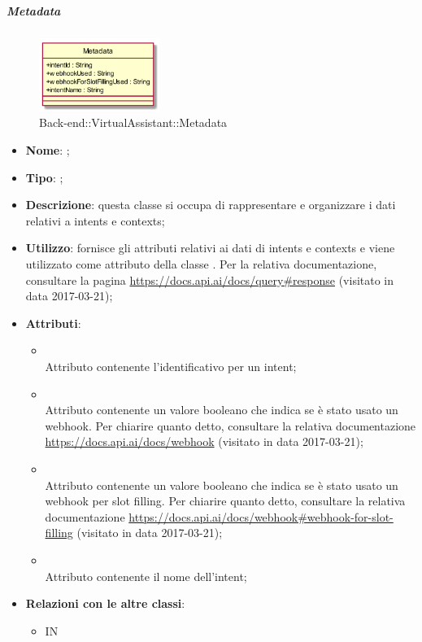 \hypertarget{Metadata_label}{\subparagraph{Metadata}}
\begin{figure}[h]
	\centering
	\includegraphics[width=0.35\textwidth,height=\textheight,keepaspectratio]{images/ClassMetadata.png}
	\caption{Back-end::VirtualAssistant::Metadata}
\end{figure}
\begin{itemize}
	\item \textbf{Nome}: ;
	\item \textbf{Tipo}: ;
	\item \textbf{Descrizione}: questa classe si occupa di rappresentare e organizzare i dati relativi a intents e contexts;
	\item \textbf{Utilizzo}: fornisce gli attributi relativi ai dati di intents e contexts e viene utilizzato come attributo della classe .
Per la relativa documentazione, consultare la pagina \url{https://docs.api.ai/docs/query#response}  (visitato in data 2017-03-21);
	\item \textbf{Attributi}:
	\begin{itemize}
		\item[]  \\
		Attributo contenente l'identificativo per un intent;
		\item[]  \\
		Attributo contenente un valore booleano che indica se è stato usato un webhook. Per chiarire quanto detto, consultare la relativa documentazione \url{https://docs.api.ai/docs/webhook}  (visitato in data 2017-03-21);
		\item[]  \\
		Attributo contenente un valore booleano che indica se è stato usato un webhook per slot filling.
Per chiarire quanto detto, consultare la relativa documentazione \url{https://docs.api.ai/docs/webhook#webhook-for-slot-filling}  (visitato in data 2017-03-21);
		\item[]  \\
		Attributo contenente il nome dell'intent;
	\end{itemize}
	\item \textbf{Relazioni con le altre classi}:
	\begin{itemize}
		\item IN \hyperlink{ProcessingResult_label}{}
	\end{itemize}
\end{itemize}
\FloatBarrier

